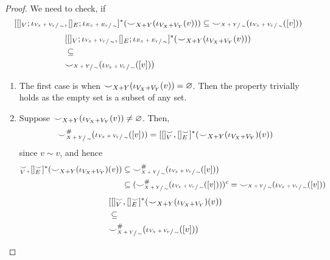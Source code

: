 \begin{proof}
    We need to check, if
    \ifdefined \ONECOLUMN
    \[
        [[]_{V};\iota_{\sfrac{V_{X} + V_{Y}}{\sim}},[]_{E};\iota_{\sfrac{E_{X} + E_{Y}}{\sim}}]^{*}({\smile}_{X+Y}(\iota_{V_{X} + V_{Y}}(v)))
        \subseteq
        {\smile}_{\sfrac{X+Y}{\sim}}(\iota_{\sfrac{V_{X} + V_{Y}}{\sim}}([v]))
    \]
    \else
    \begin{align*}
        &[[]_{V};\iota_{\sfrac{V_{X} + V_{Y}}{\sim}},[]_{E};\iota_{\sfrac{E_{X} + E_{Y}}{\sim}}]^{*}({\smile}_{X+Y}(\iota_{V_{X} + V_{Y}}(v)))\\
        &\subseteq\\
        &{\smile}_{\sfrac{X+Y}{\sim}}(\iota_{\sfrac{V_{X} + V_{Y}}{\sim}}([v]))
    \end{align*}
    \fi

    \begin{enumerate}
        \item The first case is when ${\smile}_{X+Y}(\iota_{V_{X} + V_{Y}}(v)) = \varnothing$.
              Then the property trivially holds as the empty set is a subset of any set.
        \item Suppose ${\smile}_{X+Y}(\iota_{V_{X} + V_{Y}}(v)) \not = \varnothing$.
              Then, 
              \[
                {\smile}_{\sfrac{X+Y}{\sim}}^{{\#}}(\iota_{\sfrac{V_{X} + V_{Y}}{\sim}}([v])) = [[]_{V}^{{\smile}},[]_{E}^{{\smile}}]^{*}({\smile}_{X+Y}(\iota_{V_{X} + V_{Y}})(v))
              \]
              since $v \sim v$,
              and hence
              \ifdefined \ONECOLUMN
              \begin{align*}
                [[]_{V}^{\consistency},[]_{E}^{\consistency}]^{*}(\consistency_{X+Y}(\iota_{V_{X} + V_{Y}})(v))
                &\subseteq
                \consistency_{\sfrac{X+Y}{\sim}}^{\hashtag}(\iota_{\sfrac{V_{X} + V_{Y}}{\sim}}([v]))\\
                &\subseteq
                (\consistency_{\sfrac{X+Y}{\sim}}^{\hashtag}(\iota_{\sfrac{V_{X} + V_{Y}}{\sim}}([v])))^{c} = \consistency_{\sfrac{X+Y}{\sim}}(\iota_{\sfrac{V_{X} + V_{Y}}{\sim}}([v]))\\
              \end{align*}
              \else
              \begin{align*}
                &[[]_{V}^{\consistency},[]_{E}^{\consistency}]^{*}(\consistency_{X+Y}(\iota_{V_{X} + V_{Y}})(v))\\
                &\subseteq\\
                &\consistency_{\sfrac{X+Y}{\sim}}^{\hashtag}(\iota_{\sfrac{V_{X} + V_{Y}}{\sim}}([v]))\\

\end{align*}
\end{enumerate}
\end{proof}
